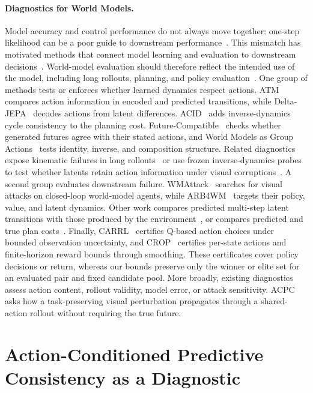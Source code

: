 \documentclass[10pt]{article}
\begin{document}
\paragraph{Diagnostics for World Models.}
Model accuracy and control performance do not always move together:
one-step likelihood can be a poor guide to downstream
performance~\cite{lambert2020objective}. This mismatch has motivated methods
that connect model learning and evaluation to downstream
decisions~\cite{wei2024objectivemismatch}. World-model evaluation should
therefore reflect the intended use of the model, including long rollouts,
planning, and policy evaluation~\cite{yu2026worldmodelevaluation}. One group
of methods tests or enforces whether learned dynamics respect actions.
ATM~\cite{chen2026atm} compares action information in encoded and predicted
transitions, while Delta-JEPA~\cite{zhang2026deltajepa} decodes actions from
latent differences. ACID~\cite{seo2026acid} adds inverse-dynamics cycle
consistency to the planning cost. Future-Compatible~\cite{ruan2026futurecompatible}
checks whether generated futures agree with their stated actions, and World
Models as Group Actions~\cite{wang2026groupactions} tests identity, inverse,
and composition structure. Related diagnostics expose kinematic failures in
long rollouts~\cite{schaefer2026kinematic} or use frozen inverse-dynamics
probes to test whether latents retain action information under visual
corruptions~\cite{yeom2026actionrelevant}. A second group evaluates downstream
failure. \mbox{WMAttack}~\cite{guo2026wmattack} searches for visual attacks on
closed-loop world-model agents, while ARB4WM~\cite{zhang2026arb4wm} targets
their policy, value, and latent dynamics. Other work compares predicted
multi-step latent transitions with those produced by the
environment~\cite{vakalis2026operator}, or compares predicted and true plan
costs~\cite{you2026controlpredictability}. Finally,
CARRL~\cite{lutjens2020certifiedrl} certifies Q-based action choices under
bounded observation uncertainty, and CROP~\cite{wu2022crop} certifies
per-state actions and finite-horizon reward bounds through smoothing. These
certificates cover policy decisions or return, whereas our bounds preserve
only the winner or elite set for an evaluated pair and fixed candidate pool.
More broadly, existing diagnostics assess action content, rollout validity,
model error, or attack sensitivity. ACPC asks how a task-preserving visual
perturbation propagates through a shared-action rollout without requiring the
true future.

\clearpage
\section{Action-Conditioned Predictive Consistency as a Diagnostic}\label{sec:acpc}
\end{document}

